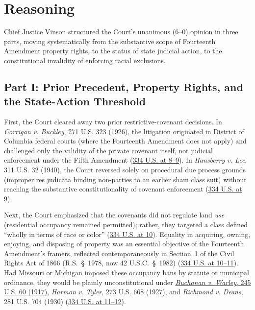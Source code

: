\documentclass[12pt]{article}
\begin{document}
\section{Reasoning}

Chief Justice Vinson structured the Court's unanimous (6--0) opinion in three parts, moving systematically from the substantive scope of Fourteenth Amendment property rights, to the status of state judicial action, to the constitutional invalidity of enforcing racial exclusions.

\subsection{Part I: Prior Precedent, Property Rights, and the State-Action Threshold}
First, the Court cleared away two prior restrictive-covenant decisions. In \textit{Corrigan v. Buckley}, 271 U.S. 323 (1926), the litigation originated in District of Columbia federal courts (where the Fourteenth Amendment does not apply) and challenged only the validity of the private covenant itself, not judicial enforcement under the Fifth Amendment (\href{https://supreme.justia.com/cases/federal/us/334/1/}{334 U.S. at 8--9}). In \textit{Hansberry v. Lee}, 311 U.S. 32 (1940), the Court reversed solely on procedural due process grounds (improper res judicata binding non-parties to an earlier sham class suit) without reaching the substantive constitutionality of covenant enforcement (\href{https://supreme.justia.com/cases/federal/us/334/1/}{334 U.S. at 9}).

Next, the Court emphasized that the covenants did not regulate land \textit{use} (residential occupancy remained permitted); rather, they targeted a class defined ``wholly in terms of race or color'' (\href{https://supreme.justia.com/cases/federal/us/334/1/}{334 U.S. at 10}). Equality in acquiring, owning, enjoying, and disposing of property was an essential objective of the Fourteenth Amendment's framers, reflected contemporaneously in Section~1 of the Civil Rights Act of 1866 (R.S.~\S~1978, now 42 U.S.C.~\S~1982) (\href{https://supreme.justia.com/cases/federal/us/334/1/}{334 U.S. at 10--11}). Had Missouri or Michigan imposed these occupancy bans by statute or municipal ordinance, they would be plainly unconstitutional under \href{https://supreme.justia.com/cases/federal/us/245/60/}{\textit{Buchanan v. Warley}, 245 U.S. 60 (1917)}, \textit{Harmon v. Tyler}, 273 U.S. 668 (1927), and \textit{Richmond v. Deans}, 281 U.S. 704 (1930) (\href{https://supreme.justia.com/cases/federal/us/334/1/}{334 U.S. at 11--12}).
\end{document}
